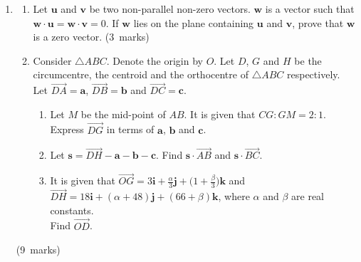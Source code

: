 \documentclass[12pt, a4paper]{article} %
\newcommand{\qmarks}[1]{\leavevmode\unskip\hspace*{\fill}\mbox{(#1 marks)}}
\begin{document}
\begin{enumerate}
    \item \begin{enumerate}
        \item Let \(\mathbf{u}\) and \(\mathbf{v}\) be two non-parallel non-zero vectors. \(\mathbf{w}\) is  a vector such that \(\mathbf{w}\cdot\mathbf{u}=\mathbf{w}\cdot\mathbf{v}=0\). If \(\mathbf{w}\) lies on the plane containing \(\mathbf{u}\) and \(\mathbf{v}\), prove that \(\mathbf{w}\) is a zero vector. \qmarks{3}
        \item Consider \(\triangle ABC\). Denote the origin by \(O\). Let \(D\), \(G\) and \(H\) be the circumcentre, the centroid and the orthocentre of \(\triangle ABC\) respectively.\\
        Let \(\overrightarrow{DA}=\mathbf{a}\), \(\overrightarrow{DB}=\mathbf{b}\) and \(\overrightarrow{DC}=\mathbf{c}\).
        \begin{enumerate}[label=(\roman*)]
            \item Let \(M\) be the mid-point of \(AB\). It is given that \(CG:GM=2:1\). Express \(\overrightarrow{DG}\) in terms of \(\mathbf{a}\), \(\mathbf{b}\) and \(\mathbf{c}\).
            \item Let \(\mathbf{s}=\overrightarrow{DH}-\mathbf{a}-\mathbf{b}-\mathbf{c}\). Find \(\mathbf{s}\cdot\overrightarrow{AB}\) and \(\mathbf{s}\cdot\overrightarrow{BC}\).
            \item It is given that \(\displaystyle \overrightarrow{OG}=3\mathbf{i}+\frac{\alpha}{3}\mathbf{j}+\bigg(1+\frac{\beta}{3}\bigg)\mathbf{k}\) and\\ \(\overrightarrow{DH}=18\mathbf{i}+(\alpha+48)\mathbf{j}+(66+\beta)\mathbf{k}\), where \(\alpha\) and \(\beta\) are real constants. 
            \\Find \(\overrightarrow{OD}\).
        \end{enumerate}
    \end{enumerate}\qmarks{9}


\end{enumerate}
\end{document}
